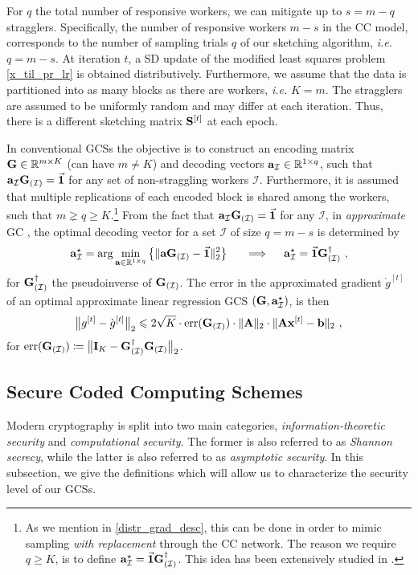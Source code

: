 \documentclass[journal,letterpaper,onecolumn,twoside,nofonttune]{IEEEtran}
\newcommand{\I}{\mathcal{I}}
\newcommand{\xb}{\bold{x}}
\newcommand{\Gb}{\bold{G}}
\newcommand{\R}{\mathbb{R}}
\newcommand{\Sb}{\bold{S}}
\newcommand{\Ab}{\bold{A}}
\newcommand{\bb}{\bold{b}}
\newcommand{\ab}{\bold{a}}
\newcommand{\Ib}{\bold{I}}
\newcommand{\err}{\mathrm{err}}
\begin{document}
For $q$ the total number of responsive workers, we can mitigate up to $s=m-q$ stragglers. Specifically, the number of responsive workers $m-s$ in the CC model, corresponds to the number of sampling trials $q$ of our sketching algorithm, \textit{i.e.} $q=m-s$. At iteration $t$, a SD update of the modified least squares problem \eqref{x_til_pr_lr} is obtained distributively. Furthermore, we assume that the data is partitioned into as many blocks as there are workers, \textit{i.e.} $K=m$. The stragglers are assumed to be uniformly random and may differ at each iteration. Thus, there is a different sketching matrix $\Sb^{[t]}$ at each epoch.

In conventional GCSs the objective is to construct an encoding matrix $\Gb\in\R^{m\times K}$ (can have $m\neq K$) and decoding vectors $\ab_\I\in\R^{1\times q}$, such that $\ab_\I\Gb_{(\I)}=\vec{\bold{1}}$ for any set of non-straggling workers $\I$. Furthermore, it is assumed that multiple replications of each encoded block is shared among the workers, such that $m\gneq q\geqslant K$.\footnote{As we mention in \ref{distr_grad_desc}, this can be done in order to mimic sampling \textit{with replacement} through the CC network. The reason we require $q\geqslant K$, is to define $\ab_\I^\star = \vec{\bold{1}}\Gb_{(\I)}^{\dagger}$. This idea has been extensively studied in \cite{CPH23b}.} From the fact that $\ab_\I\Gb_{(\I)}=\vec{\bold{1}}$ for any $\I$, in \textit{approximate} GC \cite{CPE17}, the optimal decoding vector for a set $\I$ of size $q=m-s$ is determined by
$$ \ab_\I^\star = \arg\min_{\ab\in\R^{1\times q}}\big\{\|\ab\Gb_{(\I)}-\vec{\bold{1}}\|_2^2\big\} \quad \ \implies \quad \ab_\I^\star = \vec{\bold{1}}\Gb_{(\I)}^{\dagger}\ , $$
for $\Gb_{(\I)}^{\dagger}$ the pseudoinverse of $\Gb_{(\I)}$. The error in the approximated gradient $\grave{g}^{[t]}$ of an optimal approximate linear regression GCS $(\Gb,\ab_\I^\star)$, is then
\begin{equation}
\label{appr_GC_error}
  \big\|g^{[t]}-\grave{g}^{[t]}\big\|_2 \leqslant 2\sqrt{K}\cdot\err(\Gb_{(\I)})\cdot\|\Ab\|_2\cdot\|\Ab\xb^{[t]}-\bb\|_2\ ,
\end{equation}
for $\err(\Gb_{(\I)}) \coloneqq \big\|\Ib_K-\Gb_{(\I)}^{\dagger}\Gb_{(\I)}\big\|_2$.

\subsection{Secure Coded Computing Schemes}
\label{security_subs}
Modern cryptography is split into two main categories, \textit{information-theoretic security} and \textit{computational security}. The former is also referred to as \textit{Shannon secrecy}, while the latter is also referred to as \textit{asymptotic security}. In this subsection, we give the definitions which will allow us to characterize the security level of our GCSs.
\end{document}
